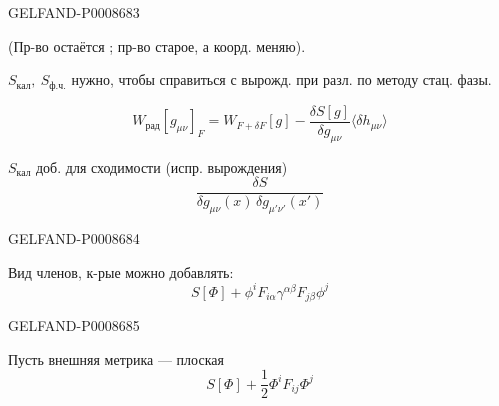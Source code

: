 \begin{GelfandAdjacentEvidence}{GELFAND-P000868}{3}


(Пр-во остаётся  ; пр-во старое, а коорд. меняю).

 $S_{\text{кал}},\ S_{\text{ф.ч.}}$
нужно, чтобы справиться с вырожд. при разл. по методу стац. фазы.

\begin{equation*}
W_{\text{рад}}[g_{\mu\nu}]_F
=W_{F+\delta F}[g]-\frac{\delta S[g]}{\delta g_{\mu\nu}}
\langle\delta h_{\mu\nu}\rangle
\tag{13}
\end{equation*}

$S_{\text{кал}}$ доб. для сходимости (испр. вырождения)
\[
\frac{\delta S}{\delta g_{\mu\nu}(x)\,\delta g_{\mu'\nu'}(x')}
\]
\end{GelfandAdjacentEvidence}
\begin{GelfandAdjacentEvidence}{GELFAND-P000868}{4}


Вид членов, к-рые можно добавлять:
\begin{equation*}
S[\Phi]+\phi^i F_{i\alpha}\gamma^{\alpha\beta}F_{j\beta}\phi^j
\tag{14}
\end{equation*}
\end{GelfandAdjacentEvidence}
\begin{GelfandAdjacentEvidence}{GELFAND-P000868}{5}


Пусть внешняя метрика --- плоская
\begin{equation*}
S[\Phi]+\frac12\Phi^i F_{ij}\Phi^j
\tag{15}
\end{equation*}
\end{GelfandAdjacentEvidence}



